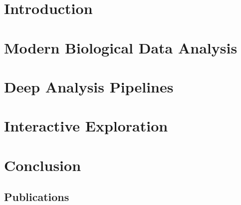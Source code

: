 \documentclass[USenglish,phd]{uit-thesis}
\begin{document}
\frontmatter
 
 

\tableofcontents
\mainmatter

\chapter{Introduction}
 

\chapter{Modern Biological Data Analysis}


\chapter{Deep Analysis Pipelines}  


\chapter{Interactive Exploration}  


\chapter{Conclusion}
 

\appendix
\begin{appendix}
    \chapter{Publications}
\end{appendix}

\backmatter



\end{document}
